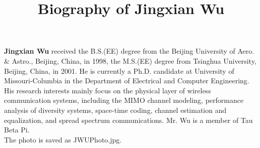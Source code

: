 \documentclass[11pt]{IEEEtran_sub}
\begin{document}
\title{Biography of Jingxian Wu}

\maketitle

{\bf Jingxian Wu} received the B.S.(EE) degree from the Beijing University 
of Aero. \& Astro., Beijing, China, in 1998, the M.S.(EE) degree 
from Tsinghua University, Beijing, China, in 2001. He is currently a Ph.D. 
candidate at University of Missouri-Columbia in the Department of Electrical 
and Computer Engineering. His research interests mainly focus on the 
physical layer of wireless communication systems, including the MIMO channel 
modeling, performance analysis of diversity systems, space-time coding, 
channel estimation and equalization, and spread spectrum communications. 
Mr. Wu is a member of Tau Beta Pi. \\


\vspace{3cm}
The photo is saved as JWUPhoto.jpg.
\end{document}
